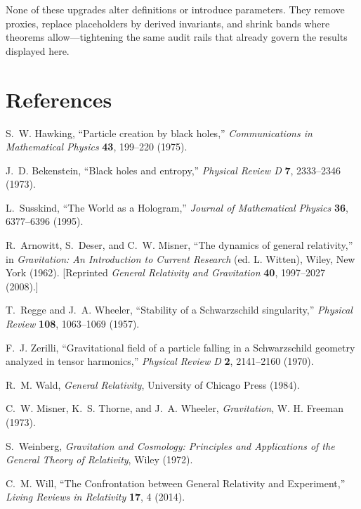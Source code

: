 \documentclass[12pt,a4paper]{article}
\begin{document}
None of these upgrades alter definitions or introduce parameters. They remove proxies, replace placeholders by derived invariants, and shrink bands where theorems allow—tightening the same audit rails that already govern the results displayed here.

\section*{References}

\begin{thebibliography}{99}

S.~W. Hawking,
``Particle creation by black holes,''
\emph{Communications in Mathematical Physics} \textbf{43}, 199--220 (1975).

J.~D. Bekenstein,
``Black holes and entropy,''
\emph{Physical Review D} \textbf{7}, 2333--2346 (1973).

L.~Susskind,
``The World as a Hologram,''
\emph{Journal of Mathematical Physics} \textbf{36}, 6377--6396 (1995).

R.~Arnowitt, S.~Deser, and C.~W. Misner,
``The dynamics of general relativity,''
in \emph{Gravitation: An Introduction to Current Research} (ed. L. Witten),
Wiley, New York (1962). [Reprinted \emph{General Relativity and Gravitation} \textbf{40}, 1997--2027 (2008).]

T.~Regge and J.~A. Wheeler,
``Stability of a Schwarzschild singularity,''
\emph{Physical Review} \textbf{108}, 1063--1069 (1957).

F.~J. Zerilli,
``Gravitational field of a particle falling in a Schwarzschild geometry analyzed in tensor harmonics,''
\emph{Physical Review D} \textbf{2}, 2141--2160 (1970).

R.~M. Wald,
\emph{General Relativity},
University of Chicago Press (1984).

C.~W. Misner, K.~S. Thorne, and J.~A. Wheeler,
\emph{Gravitation},
W. H. Freeman (1973).

S.~Weinberg,
\emph{Gravitation and Cosmology: Principles and Applications of the General Theory of Relativity},
Wiley (1972).

C.~M. Will,
``The Confrontation between General Relativity and Experiment,''
\emph{Living Reviews in Relativity} \textbf{17}, 4 (2014).


\end{thebibliography}
\end{document}
